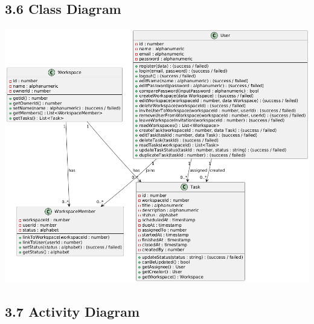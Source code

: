 \subsection*{3.6 Class Diagram}
\includegraphics[width=1\textwidth]{assets/class_diagram.png}

\subsection*{3.7 Activity Diagram}
                                 
